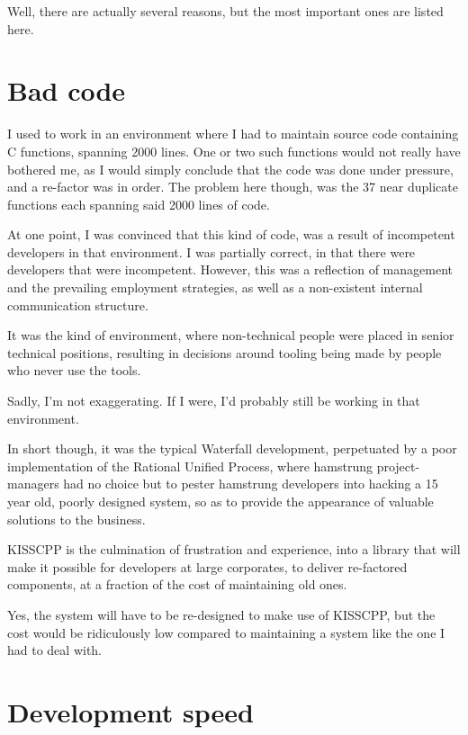 Well, there are actually several reasons, but the most important ones are listed here.

\section*{Bad code}

I used to work in an environment where I had to maintain source code containing C functions, spanning 2000 lines. One or two such functions would not really have bothered me, as I would simply conclude that the code was done under pressure, and a re-\/factor was in order. The problem here though, was the 37 near duplicate functions each spanning said 2000 lines of code.

At one point, I was convinced that this kind of code, was a result of incompetent developers in that environment. I was partially correct, in that there were developers that were incompetent. However, this was a reflection of management and the prevailing employment strategies, as well as a non-\/existent internal communication structure.

It was the kind of environment, where non-\/technical people were placed in senior technical positions, resulting in decisions around tooling being made by people who never use the tools.

Sadly, I'm not exaggerating. If I were, I'd probably still be working in that environment.

In short though, it was the typical Waterfall development, perpetuated by a poor implementation of the Rational Unified Process, where hamstrung project-\/managers had no choice but to pester hamstrung developers into hacking a 15 year old, poorly designed system, so as to provide the appearance of valuable solutions to the business.

K\-I\-S\-S\-C\-P\-P is the culmination of frustration and experience, into a library that will make it possible for developers at large corporates, to deliver re-\/factored components, at a fraction of the cost of maintaining old ones.

Yes, the system will have to be re-\/designed to make use of K\-I\-S\-S\-C\-P\-P, but the cost would be ridiculously low compared to maintaining a system like the one I had to deal with.

\section*{Development speed}

